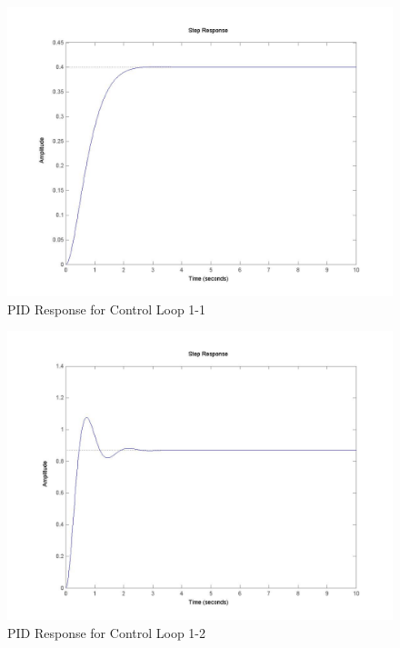	\begin{figure}[H]
		\includegraphics[width=\textwidth]{part1-1.jpg}
		\caption{PID Response for Control Loop 1-1}
	\end{figure}
	
	\begin{figure}[H]
		\includegraphics[width=\textwidth]{part1-2.jpg}
		\caption{PID Response for Control Loop 1-2}
	\end{figure}
	
